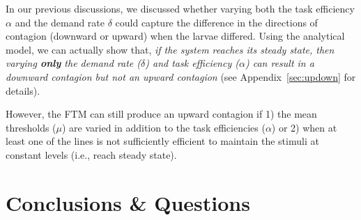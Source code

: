 \documentclass[11pt]{article}
\begin{document}
In our previous discussions, we discussed whether varying both the task efficiency $\alpha$ and the demand rate $\delta$ could capture the difference in the directions of contagion (downward or upward) when the larvae differed. Using the analytical model, we can actually show that, \textit{if the system reaches its steady state, then varying \textbf{only} the demand rate ($\delta$) and task efficiency ($\alpha$) can result in a downward contagion but not an upward contagion} (see Appendix~\ref{sec:updown} for details).

However, the FTM can still produce an upward contagion if 1) the mean thresholds ($\mu$) are varied in addition to the task efficiencies ($\alpha$) or 2) when at least one of the lines is not sufficiently efficient to maintain the stimuli at constant levels (i.e., reach steady state).

\section{Conclusions \& Questions} \label{sec:conclusions}
\end{document}
